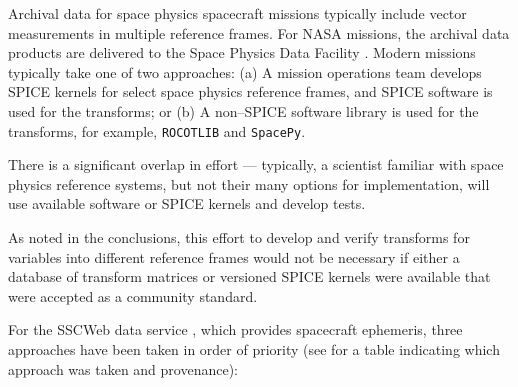 \documentclass[draft]{agujournal2019}
\begin{document}
Archival data for space physics spacecraft missions typically include vector measurements in multiple reference frames. For NASA missions, the archival data products are delivered to the Space Physics Data Facility \cite{SPDF}. Modern missions typically take one of two approaches: (a) A mission operations team develops SPICE kernels for select space physics reference frames, and SPICE software is used for the transforms; or (b) A non--SPICE software library is used for the transforms, for example, \texttt{ROCOTLIB} and \texttt{SpacePy}. 

There is a significant overlap in effort --- typically, a scientist familiar with space physics reference systems, but not their many options for implementation, will use available software or SPICE kernels and develop tests. 

As noted in the conclusions, this effort to develop and verify transforms for variables into different reference frames would not be necessary if either a database of transform matrices or versioned SPICE kernels were available that were accepted as a community standard.

For the SSCWeb data service \cite{SSCWeb}, which provides spacecraft ephemeris, three approaches have been taken in order of priority (see  for a table indicating which approach was taken and provenance):
\end{document}
